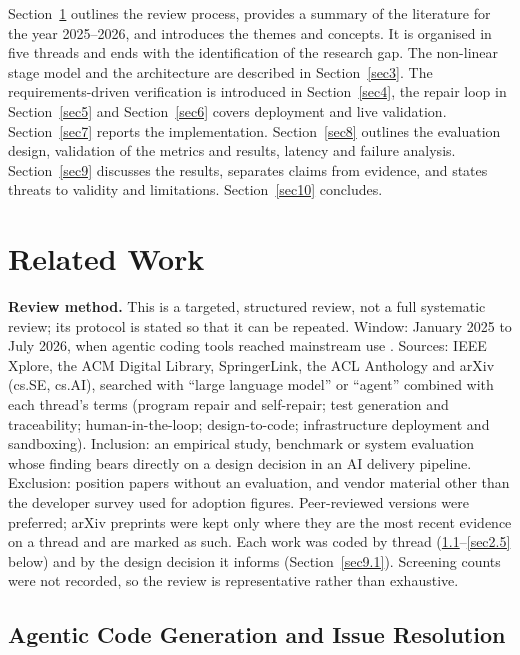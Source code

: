\documentclass[pdflatex,sn-mathphys-num]{sn-jnl}%
\theoremstyle{thmstyleone}%
\theoremstyle{thmstyletwo}%
\theoremstyle{thmstylethree}%
\begin{document}
Section~\ref{sec2} outlines the review process, provides a summary of the literature for the year 2025--2026, and introduces the themes and concepts. It is organised in five threads and ends with the identification of the research gap. The non-linear stage model and the architecture are described in Section~\ref{sec3}. The requirements-driven verification is introduced in Section~\ref{sec4}, the repair loop in Section~\ref{sec5} and Section~\ref{sec6} covers deployment and live validation. Section~\ref{sec7} reports the implementation. Section~\ref{sec8} outlines the evaluation design, validation of the metrics and results, latency and failure analysis. Section~\ref{sec9} discusses the results, separates claims from evidence, and states threats to validity and limitations. Section~\ref{sec10} concludes.

\section{Related Work}\label{sec2}

\textbf{Review method.} This is a targeted, structured review, not a full systematic review; its protocol is stated so that it can be repeated. Window: January 2025 to July 2026, when agentic coding tools reached mainstream use \cite{r03stackoverflow}. Sources: IEEE Xplore, the ACM Digital Library, SpringerLink, the ACL Anthology and arXiv (cs.SE, cs.AI), searched with ``large language model'' or ``agent'' combined with each thread's terms (program repair and self-repair; test generation and traceability; human-in-the-loop; design-to-code; infrastructure deployment and sandboxing). Inclusion: an empirical study, benchmark or system evaluation whose finding bears directly on a design decision in an AI delivery pipeline. Exclusion: position papers without an evaluation, and vendor material other than the developer survey used for adoption figures. Peer-reviewed versions were preferred; arXiv preprints were kept only where they are the most recent evidence on a thread and are marked as such. Each work was coded by thread (\ref{sec2.1}--\ref{sec2.5} below) and by the design decision it informs (Section~\ref{sec9.1}). Screening counts were not recorded, so the review is representative rather than exhaustive.%

\subsection{Agentic Code Generation and Issue Resolution}\label{sec2.1}
\end{document}
